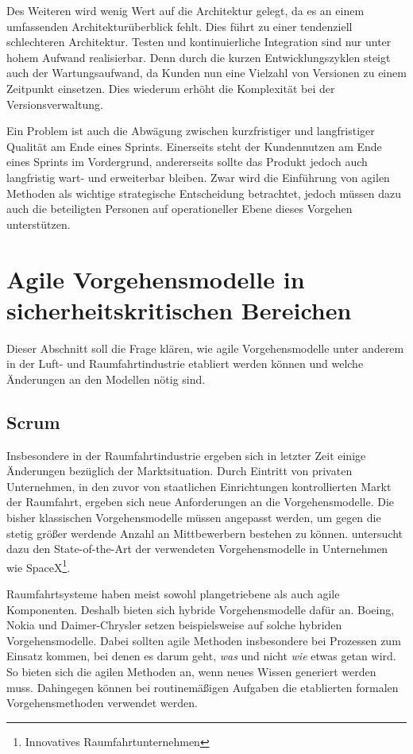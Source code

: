 Des Weiteren wird wenig Wert auf die Architektur gelegt, da es an einem umfassenden Architekturüberblick fehlt. 
Dies führt zu einer tendenziell schlechteren Architektur.
Testen und kontinuierliche Integration sind nur unter hohem Aufwand realisierbar.
Denn durch die kurzen Entwicklungszyklen steigt auch der Wartungsaufwand, da Kunden nun eine Vielzahl von Versionen zu einem Zeitpunkt einsetzen.
Dies wiederum erhöht die Komplexität bei der Versionsverwaltung.
\parencite[Vgl.][S. 1486]{Petersen20091479}

Ein Problem ist auch die Abwägung zwischen kurzfristiger und langfristiger Qualität am Ende eines Sprints.
Einerseits steht der Kundennutzen am Ende eines Sprints im Vordergrund, andererseits sollte das Produkt jedoch auch langfristig wart- und erweiterbar bleiben.
Zwar wird die Einführung von agilen Methoden als wichtige strategische Entscheidung betrachtet, jedoch müssen dazu auch die beteiligten Personen auf operationeller Ebene dieses Vorgehen unterstützen.
\parencite[Vgl.][S. 863 f.]{Moe:2012aa}

\section{Agile Vorgehensmodelle in sicherheitskritischen Bereichen} %

Dieser Abschnitt soll die Frage klären, wie agile Vorgehensmodelle unter anderem in der Luft- und Raumfahrtindustrie etabliert werden können und welche Änderungen an den Modellen nötig sind.

\subsection{Scrum} 

Insbesondere in der Raumfahrtindustrie ergeben sich in letzter Zeit einige Änderungen bezüglich der Marktsituation.
Durch Eintritt von privaten Unternehmen, in den zuvor von staatlichen Einrichtungen kontrollierten Markt der Raumfahrt, ergeben sich neue Anforderungen an die Vorgehensmodelle.
Die bisher klassischen Vorgehensmodelle müssen angepasst werden, um gegen die stetig größer werdende Anzahl an Mittbewerbern bestehen zu können.
\parencite[][]{Carpenter:2014aa} untersucht dazu den State-of-the-Art der verwendeten Vorgehensmodelle in Unternehmen wie SpaceX\footnote{Innovatives Raumfahrtunternehmen}.

Raumfahrtsysteme haben meist sowohl plangetriebene als auch agile Komponenten.
Deshalb bieten sich hybride Vorgehensmodelle dafür an.
Boeing, Nokia und Daimer-Chrysler setzen beispielsweise auf solche hybriden  Vorgehensmodelle.
Dabei sollten agile Methoden insbesondere bei Prozessen zum Einsatz kommen, bei denen es darum geht, \emph{was} und nicht \emph{wie} etwas getan wird.
So bieten sich die agilen Methoden an, wenn neues Wissen generiert werden muss. 
Dahingegen können bei routinemäßigen Aufgaben die etablierten formalen Vorgehensmethoden verwendet werden.
\parencite[Vgl.][S. 43]{Carpenter:2014aa}

